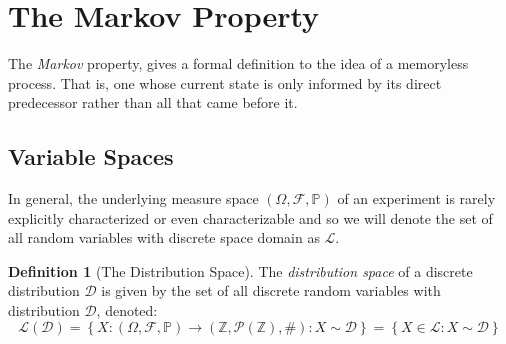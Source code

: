 \documentclass[a4paper,11pt,oneside]{book}
\theoremstyle{plain}
\theoremstyle{definition}
\newtheorem{defn}{Definition}[section]
\begin{document}
\section{The Markov Property}
The \emph{Markov} property, gives a formal definition to the idea of a memoryless process. That is, one whose current state is only informed by its direct predecessor rather than all that came before it.







\subsection{Variable Spaces}
In general, the underlying measure space $(\Omega, \mathcal{F},\mathbb{P})$ of an experiment is rarely explicitly characterized or even characterizable and so we will denote the set of all random variables with discrete space domain as $\mathcal{L}$.
\begin{defn}[The Distribution Space]
The \emph{distribution space} of a discrete distribution $\mathcal{D}$ is given by the set of all discrete random variables with distribution $\mathcal{D}$, denoted:
\[\mathcal{L}(\mathcal{D})=\left\{X:(\Omega, \mathcal{F},\mathbb{P})\rightarrow (\mathbb{Z},\mathcal{P}(\mathbb{Z}),\#) : X \sim \mathcal{D} \right\}=\left\{X \in \mathcal{L} : X \sim \mathcal{D} \right\}\]
\end{defn}
\end{document}
